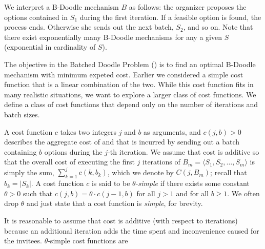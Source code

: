 We interpret a B-Doodle mechanism $B$ as follows: the organizer proposes the options contained in $S_1$ during the first iteration. If a feasible option is found, the process ends. Otherwise she sends out the next batch, $S_2$, and so on.
Note that there exist exponentially many B-Doodle mechanisms for any a given $S$ (exponential in cardinality of $S$).

The objective in the Batched Doodle Problem (\BDP) is to find an optimal B-Doodle mechanism with minimum expeted cost.
Earlier we considered a simple cost function that is a linear combination of the two.
While this cost function fits in many realistic situations, we want to explore a larger class of cost functions.
We define a class of cost functions that depend only on the number of iterations and batch sizes.
\begin{definition} \label{bdoodle:def:CostFunction}
	A cost function $c$ takes two integers $j$ and $b$ as arguments, and $c(j, b) > 0$ describes the aggregate cost of \Times and \Inconveniences that is incurred by sending out a batch containing $b$ options during the $j$-th iteration. 
	We assume that cost is additive so that the overall cost of executing the first $j$ iterations of ${B}_m = \langle S_1, S_2, \dots, S_m \rangle$ is simply the sum, $\sum_{k=1}^{j} c(k, b_k)$, which we denote by $C(j, {B}_m)$; recall that $b_k = |S_k|$.
A cost function $c$ is said to be $\theta$-\emph{simple} if there exists some constant $\theta>0$ such that $c(j, b) = \theta \cdot c(j-1, b)$ for all $j > 1$ and for all $b \geq 1$.
We often drop $\theta$ and just state that a cost function is \emph{simple}, for brevity.
\end{definition}
It is reasonable to assume that cost is additive (with respect to iterations) because an additional iteration adds the time spent and inconvenience caused for the invitees.
$\theta$-simple cost functions are 

